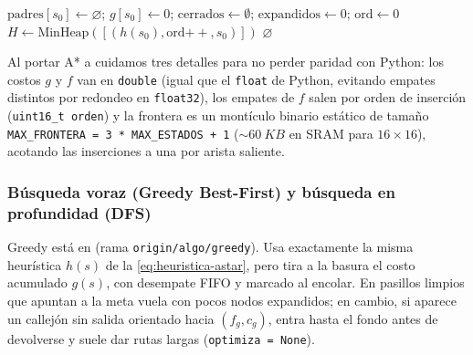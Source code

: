 \begin{algorithm}[H]
  \caption{A* sobre estados con orientación ( / )}
  \label{alg:astar}
  $\text{padres}[s_0] \leftarrow \varnothing$; $g[s_0] \leftarrow 0$; $\text{cerrados} \leftarrow \emptyset$; $\text{expandidos} \leftarrow 0$; $\text{ord} \leftarrow 0$\;
  $H \leftarrow \text{MinHeap}([(h(s_0), \text{ord}{++}, s_0)])$\;
  \Return $\varnothing$\;
\end{algorithm}

Al portar A* a  cuidamos tres detalles para no perder paridad con Python: los costos $g$ y $f$ van en \texttt{double} (igual que el \texttt{float} de Python, evitando empates distintos por redondeo en \texttt{float32}), los empates de $f$ salen por orden de inserción (\texttt{uint16\_t orden}) y la frontera es un montículo binario estático de tamaño \texttt{MAX\_FRONTERA = 3 * MAX\_ESTADOS + 1} ($\sim\SI{60}{KB}$ en SRAM para $16 \times 16$), acotando las inserciones a una por arista saliente.

\subsubsection{Búsqueda voraz (Greedy Best-First) y búsqueda en profundidad (DFS)}

Greedy está en  (rama \texttt{origin/algo/greedy}). Usa exactamente la misma heurística $h(s)$ de la \cref{eq:heuristica-astar}, pero tira a la basura el costo acumulado $g(s)$, con desempate FIFO y marcado al encolar. En pasillos limpios que apuntan a la meta vuela con pocos nodos expandidos; en cambio, si aparece un callejón sin salida orientado hacia $(f_g, c_g)$, entra hasta el fondo antes de devolverse y suele dar rutas largas (\texttt{optimiza = None}).

